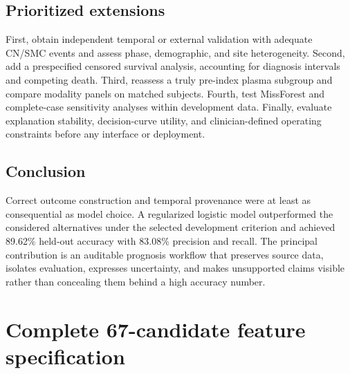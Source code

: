 \documentclass[11pt,a4paper]{article}
\begin{document}
\subsection{Prioritized extensions}
First, obtain independent temporal or external validation with adequate CN/SMC events and assess phase, demographic, and site heterogeneity. Second, add a prespecified censored survival analysis, accounting for diagnosis intervals and competing death. Third, reassess a truly pre-index plasma subgroup and compare modality panels on matched subjects. Fourth, test MissForest and complete-case sensitivity analyses within development data. Finally, evaluate explanation stability, decision-curve utility, and clinician-defined operating constraints before any interface or deployment.

\subsection{Conclusion}
Correct outcome construction and temporal provenance were at least as consequential as model choice. A regularized logistic model outperformed the considered alternatives under the selected development criterion and achieved 89.62\% held-out accuracy with 83.08\% precision and recall. The principal contribution is an auditable prognosis workflow that preserves source data, isolates evaluation, expresses uncertainty, and makes unsupported claims visible rather than concealing them behind a high accuracy number.

\clearpage
\appendix\section{Complete 67-candidate feature specification}
\end{document}
